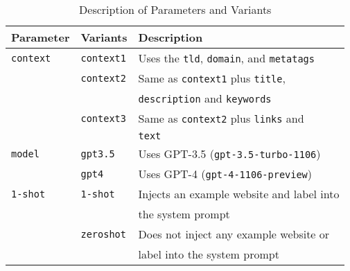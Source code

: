 \begin{table}[htbp]
    \centering
    \begin{tabular}{lll}
        \toprule
        \textbf{Parameter} & \textbf{Variants} & \textbf{Description} \\
        \midrule
        \texttt{context} 
            & \texttt{context1} & Uses the \texttt{tld}, \texttt{domain}, and \texttt{metatags} \\
            
            & \texttt{context2} & Same as \texttt{context1} plus \texttt{title}, \\ & & \texttt{description} and \texttt{keywords} \\
            
            & \texttt{context3} & Same as \texttt{context2} plus \texttt{links} and \\ & & \texttt{text}\\

        \addlinespace
        \texttt{model} 
            & \texttt{gpt3.5} & Uses GPT-3.5 (\texttt{gpt-3.5-turbo-1106}) \\
            
            & \texttt{gpt4}   & Uses GPT-4 (\texttt{gpt-4-1106-preview}) \\
        
        \addlinespace
        \texttt{1-shot} 
            & \texttt{1-shot} & Injects an example website and label into \\ & & the system prompt \\
            
            & \texttt{zeroshot} & Does not inject any example website or \\ & & label into  the system prompt \\
        \bottomrule
    
    \end{tabular}
    \caption{Description of Parameters and Variants}
    \label{tab:labelers_setup}
\end{table}